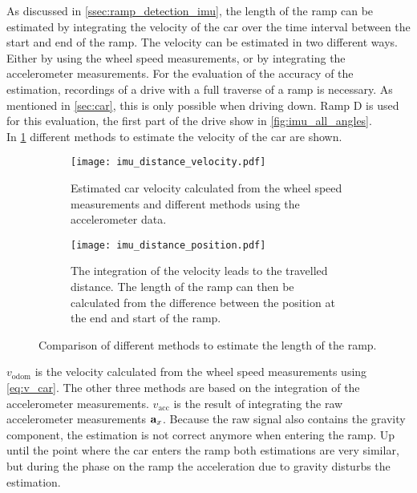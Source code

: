 As discussed in \cref{ssec:ramp_detection_imu}, the length of the ramp can be estimated by integrating the velocity of the car over the time interval between the start and end of the ramp.
The velocity can be estimated in two different ways.
Either by using the wheel speed measurements, or by integrating the accelerometer measurements.
For the evaluation of the accuracy of the estimation, recordings of a drive with a full traverse of a ramp is necessary.
As mentioned in \cref{sec:car}, this is only possible when driving down.
Ramp D is used for this evaluation, the first part of the drive show in \cref{fig:imu_all_angles}.\\
In \cref{fig:imu_distance_velocity} different methods to estimate the velocity of the car are shown.
\begin{figure}[htb]
    \centering
    \begin{subfigure}{1\textwidth}
        \centering
        \texttt{[image: imu\_distance\_velocity.pdf]}
        \caption[Car velocity estimation]{Estimated car velocity calculated from the wheel speed measurements and different methods using the accelerometer data.}
        \label{fig:imu_distance_velocity}
    \end{subfigure}
    
    \begin{subfigure}{1\textwidth}
        \centering
        \texttt{[image: imu\_distance\_position.pdf]}
        \caption[Car travelled distance estimation]{The integration of the velocity leads to the travelled distance. The length of the ramp can then be calculated from the difference between the position at the end and start of the ramp.}
        \label{fig:imu_distance_position}
    \end{subfigure}
    \caption[Ramp length estimation using various methods]{Comparison of different methods to estimate the length of the ramp.}
\end{figure}
$v_\mathrm{odom}$ is the velocity calculated from the wheel speed measurements using \cref{eq:v_car}.
The other three methods are based on the integration of the accelerometer measurements.
$v_\mathrm{acc}$ is the result of integrating the raw accelerometer measurements $\vb{a}_x$.
Because the raw signal also contains the gravity component, the estimation is not correct anymore when entering the ramp.
Up until the point where the car enters the ramp both estimations are very similar, but during the phase on the ramp the acceleration due to gravity disturbs the estimation.
